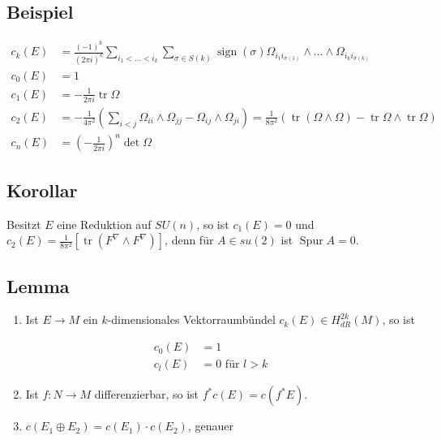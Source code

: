 \documentclass[10pt, letterpaper]{article}
\begin{document}
\subsection*{Beispiel}
$$
\begin{aligned}
c_{k}(E) & =\frac{(-1)^{k}}{(2 \pi i)^{k}} \sum_{i_{1}<\ldots<i_{k}} \sum_{\sigma \in S(k)} \operatorname{sign}(\sigma) \Omega_{i_{1} i_{\sigma(1)}} \wedge \ldots \wedge \Omega_{i_{k} i_{\sigma(k)}} \\
c_{0}(E) & =1 \\
c_{1}(E) & =-\frac{1}{2 \pi i} \operatorname{tr} \Omega \\
c_{2}(E) & =-\frac{1}{4 \pi^{2}}\left(\sum_{i<j} \Omega_{i i} \wedge \Omega_{j j}-\Omega_{i j} \wedge \Omega_{j i}\right)=\frac{1}{8 \pi^{2}}(\operatorname{tr}(\Omega \wedge \Omega)-\operatorname{tr} \Omega \wedge \operatorname{tr} \Omega) \\
c_{n}(E) & =\left(-\frac{1}{2 \pi i}\right)^{n} \operatorname{det} \Omega
\end{aligned}
$$

\subsection*{Korollar}
Besitzt $E$ eine Reduktion auf $S U(n)$, so ist $c_{1}(E)=0$ und $c_{2}(E)=\frac{1}{8 \pi^{2}}\left[\operatorname{tr}\left(F^{\nabla} \wedge\right.\right. \left.\left.F^{\nabla}\right)\right]$, denn für $A \in s u(2)$ ist $\operatorname{Spur} A=0$.

\subsection*{Lemma}
\begin{enumerate}
  \item Ist $E \rightarrow M$ ein $k$-dimensionales Vektorraumbündel $c_{k}(E) \in H_{d R}^{2 k}(M)$, so ist
\end{enumerate}

$$
\begin{aligned}
c_{0}(E) & =1 \\
c_{l}(E) & =0 \text { für } l>k
\end{aligned}
$$

\begin{enumerate}
  \setcounter{enumi}{1}
  \item Ist $f: N \rightarrow M$ differenzierbar, so ist $f^{*} c(E)=c\left(f^{*} E\right)$.
  \item $c\left(E_{1} \oplus E_{2}\right)=c\left(E_{1}\right) \cdot c\left(E_{2}\right)$, genauer
\end{enumerate}
\end{document}

